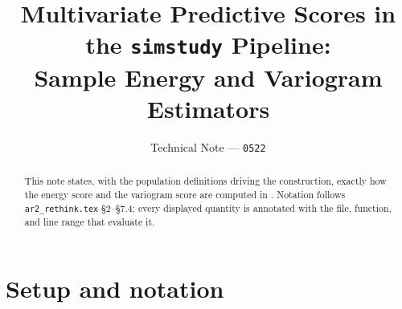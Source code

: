 \documentclass[11pt]{article}
\title{
  Multivariate Predictive Scores in the \texttt{simstudy} Pipeline:\\
  Sample Energy and Variogram Estimators
}
\author{Technical Note --- \texttt{0522}}
\date{}
\begin{document}
\maketitle

\begin{abstract}
This note states, with the population definitions driving the
construction, exactly how the energy score and the variogram score are
computed in . Notation follows
\texttt{ar2\_rethink.tex} \S2--\S7.4; every displayed quantity is
annotated with the file, function, and line range that evaluate it.
\end{abstract}

\section{Setup and notation}
\label{sec:setup}
\end{document}
